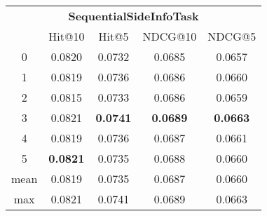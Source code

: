 \documentclass{article}
\begin{document}
 

\begin{tabular}{c|cccc}

\multicolumn{5}{c}{\textbf{SequentialSideInfoTask}} \\
\noalign{\smallskip}
\noalign{\smallskip}
\toprule
\multicolumn{1}{c}{Template ID}	&	\multicolumn{1}{|c}{Hit@10}	&	\multicolumn{1}{c}{Hit@5}	&	\multicolumn{1}{c}{NDCG@10}	&	\multicolumn{1}{c}{NDCG@5}\\
\midrule
0	&	0.0820	&	0.0732	&	0.0685	&	0.0657\\
1	&	0.0819	&	0.0736	&	0.0686	&	0.0660\\
2	&	0.0815	&	0.0733	&	0.0686	&	0.0659\\
3	&	0.0821	&	\textbf{0.0741}	&	\textbf{0.0689}	&	\textbf{0.0663}\\
4	&	0.0819	&	0.0736	&	0.0687	&	0.0661\\
5	&	\textbf{0.0821}	&	0.0735	&	0.0688	&	0.0660\\
\midrule
mean	&	0.0819	&	0.0735	&	0.0687	&	0.0660\\
max	&	0.0821	&	0.0741	&	0.0689	&	0.0663\\
\bottomrule

\end{tabular}
\end{document}
